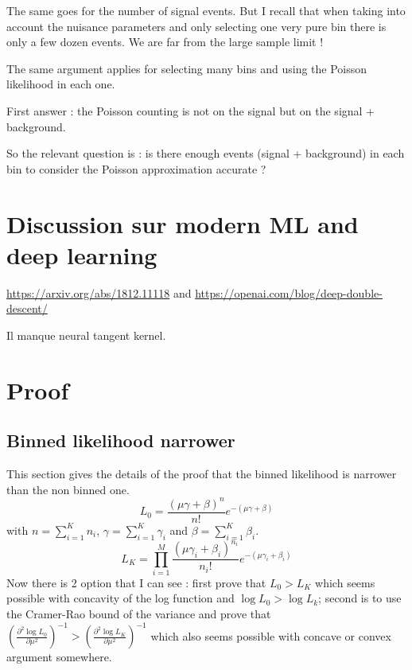 The same goes for the number of signal events.
But I recall that when taking into account the nuisance parameters and only selecting one very pure bin there is only a few dozen events.
We are far from the large sample limit !

The same argument applies for selecting many bins and using the Poisson likelihood in each one.

First answer : the Poisson counting is not on the signal but on the signal + background.

So the relevant question is : is there enough events (signal + background) in each bin to consider the Poisson approximation accurate ?






\section{Discussion sur modern ML and deep learning} %
\label{sec:discussion_sur_modern_ml_and_deep_learning}


\url{https://arxiv.org/abs/1812.11118} and 
\url{https://openai.com/blog/deep-double-descent/}

Il manque neural tangent kernel.







\section{Proof}
\label{sec:proof}





\subsection{Binned likelihood narrower}

This section gives the details of the proof that the binned likelihood is narrower than the non binned one.
\begin{equation}
    L_0 = \frac{(\mu \gamma + \beta)^n }{n!} e^{-(\mu \gamma + \beta)}
\end{equation}
with $n = \sum_{i=1}^K n_i $, $\gamma = \sum_{i=1}^K \gamma_i $ and $\beta = \sum_{i=1}^K \beta_i $.
\begin{equation}
    L_K = \prod_{i=1}^M \frac{(\mu \gamma_i + \beta_i)^{n_i} }{n_i!} e^{-(\mu \gamma_i + \beta_i)}
\end{equation}
Now there is 2 option that I can see :  first prove that $L_0 > L_K$ which seems possible with concavity of the log function and $\log L_0 > \log L_k$;
second is to use the Cramer-Rao bound of the variance and prove that 
$\left (\frac{\partial^2 \log L_0}{\partial \mu^2}\right )^{-1} > \left (\frac{\partial^2 \log L_K}{\partial \mu^2}\right )^{-1}$
which also seems possible with concave or convex argument somewhere.

